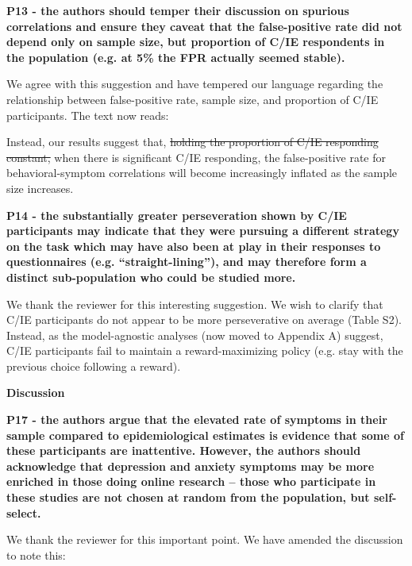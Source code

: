 \documentclass[a4paper,notitlepage,12pt]{article}
\begin{document}
\textbf{P13 - the authors should temper their discussion on spurious correlations and ensure they caveat that the false-positive rate did not depend only on sample size, but proportion of C/IE respondents in the population (e.g. at 5\% the FPR actually seemed stable).}

We agree with this suggestion and have tempered our language regarding the relationship between false-positive rate, sample size, and proportion of C/IE participants. The text now reads:

\begin{displayquote}
Instead, our results suggest that, \st{holding the proportion of C/IE responding constant,} when there is significant C/IE responding, the false-positive rate for behavioral-symptom correlations will become increasingly inflated as the sample size increases.
\end{displayquote}

\textbf{P14 - the substantially greater perseveration shown by C/IE participants may indicate that they were pursuing a different strategy on the task which may have also been at play in their responses to questionnaires (e.g. ``straight-lining''), and may therefore form a distinct sub-population who could be studied more.}

We thank the reviewer for this interesting suggestion. We wish to clarify that C/IE participants do not appear to be more perseverative on average (Table S2). Instead, as the model-agnostic analyses (now moved to Appendix A) suggest, C/IE participants fail to maintain a reward-maximizing policy (e.g. stay with the previous choice following a reward). 

\textbf{Discussion}

\textbf{P17 - the authors argue that the elevated rate of symptoms in their sample compared to epidemiological estimates is evidence that some of these participants are inattentive. However, the authors should acknowledge that depression and anxiety symptoms may be more enriched in those doing online research – those who participate in these studies are not chosen at random from the population, but self-select.}

We thank the reviewer for this important point. We have amended the discussion to note this:
\end{document}
